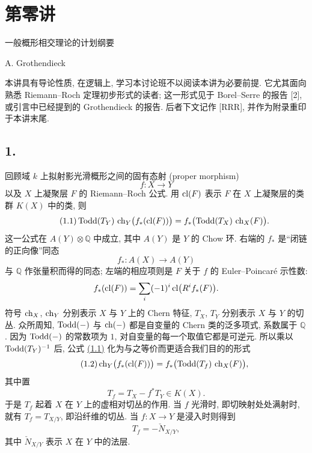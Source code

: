 \section*{第零讲}
\begin{center}
{\large 一般概形相交理论的计划纲要}\par
A. Grothendieck
\end{center}

本讲具有导论性质, 在逻辑上, 学习本讨论班不以阅读本讲为必要前提. 它尤其面向熟悉 Riemann--Roch 定理初步形式的读者; 这一形式见于 Borel--Serre 的报告 [2], 或引言中已经提到的 Grothendieck 的报告. 后者下文记作 [RRR], 并作为附录重印于本讲末尾.

\subsection*{1.}
回顾域 $k$ 上拟射影光滑概形之间的固有态射 (proper morphism)
\[
f:X\longrightarrow Y
\]
以及 $X$ 上凝聚层 $F$ 的 Riemann--Roch 公式. 用 $\operatorname{cl}(F)$ 表示 $F$ 在 $X$ 上凝聚层的类群 $K(X)$ 中的类, 则
\begin{equation}\tag{1.1}
\operatorname{Todd}(T_Y)\,\operatorname{ch}_Y\bigl(f_*(\operatorname{cl}(F))\bigr)=f_*\bigl(\operatorname{Todd}(T_X)\,\operatorname{ch}_X(F)\bigr).
\end{equation}
这一公式在 $A(Y)\otimes\mathbb Q$ 中成立, 其中 $A(Y)$ 是 $Y$ 的 Chow 环. 右端的 $f_*$ 是“闭链的正向像”同态
\[
f_*:A(X)\longrightarrow A(Y)
\]
与 $\mathbb Q$ 作张量积而得的同态; 左端的相应项则是 $F$ 关于 $f$ 的 Euler--Poincaré 示性数:
\[
f_*(\operatorname{cl}(F))=\sum_i(-1)^i\operatorname{cl}\bigl(R^if_*(F)\bigr).
\]
符号 $\operatorname{ch}_X$, $\operatorname{ch}_Y$ 分别表示 $X$ 与 $Y$ 上的 Chern 特征, $T_X$, $T_Y$ 分别表示 $X$ 与 $Y$ 的切丛. 众所周知, $\operatorname{Todd}(-)$ 与 $\operatorname{ch}(-)$ 都是自变量的 Chern 类的泛多项式, 系数属于 $\mathbb Q$. 因为 $\operatorname{Todd}(-)$ 的常数项为 $1$, 对自变量的每一个取值它都是可逆元. 所以乘以 $\operatorname{Todd}(T_Y)^{-1}$ 后, 公式 \hyperlink{sga6.e00.eq.1-1}{(1.1)} 化为与之等价而更适合我们目的的形式
\begin{equation}\tag{1.2}
\operatorname{ch}_Y\bigl(f_*(\operatorname{cl}(F))\bigr)=f_*\bigl(\operatorname{Todd}(T_f)\,\operatorname{ch}_X(F)\bigr),
\end{equation}
其中置
\begin{equation}\tag{1.3}
T_f=T_X-f^*T_Y\in K(X).
\end{equation}
于是 $T_f$ 起着 $X$ 在 $Y$ 上的虚相对切丛的作用. 当 $f$ 光滑时, 即切映射处处满射时, 就有 $T_f=T_{X/Y}$, 即沿纤维的切丛. 当 $f:X\to Y$ 是浸入时则得到
\[
T_f=-\check N_{X/Y},
\]
其中 $\check N_{X/Y}$ 表示 $X$ 在 $Y$ 中的法层.

